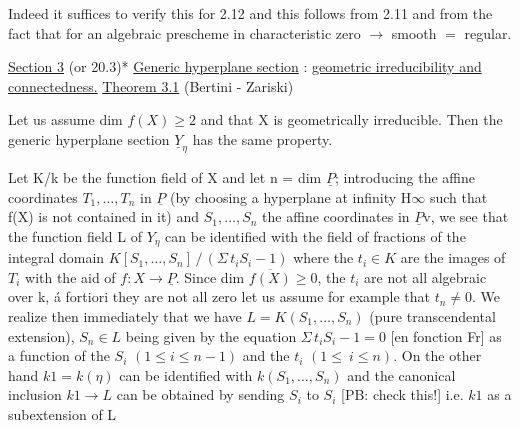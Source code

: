 
Indeed it suffices to verify this for 2.12 and this follows
from 2.11 and from the fact that for an algebraic prescheme in
characteristic zero $\rightarrow$ smooth $=$ regular.

\uline{Section 3} (or 20.3)*
\uline{Generic hyperplane section} : \uline{geometric irreducibility and}
\uline{connectedness.}
\uline{Theorem 3.1} (Bertini - Zariski)

Let us assume dim $f(X) \geq 2$ and that X is geometrically
irreducible. Then the generic hyperplane section $\underline{Y}_{\eta}$ has the same
property.

Let K/k be the function field of X and let n = dim $\underline{P}$;
introducing the affine coordinates $T_1,\dots,T_n$ in $\underline{P}$ (by choosing a
hyperplane at infinity H$\infty$ such that f(X) is not contained in it)
and $S_1,\dots,S_n$ the affine coordinates in $\underline{P}$v, we see that the
function field L of $Y_{\eta}$ can be identified with the field of
fractions of the integral domain $K[S_1,\dots,S_n] \,/\, (\Sigma\, t_iS_i - 1)$ where
the $t_i \in K$ are the images of $T_i$ with the aid of $f{:}X \rightarrow \underline{P}$. Since
dim $\overline{f(X)} \geq 0$, the $t_i$ are not all algebraic over k, á fortiori they
are not all zero let us assume for example that $t_n \neq 0$. We realize
then immediately that we have $L = K(S_1,\dots,S_n)$ (pure transcendental
extension), $S_n \in L$ being given by the equation $\Sigma\, t_iS_i - 1 = 0$
[en fonction Fr] as a function of the $S_i$ $(1 \leq i \leq n - 1)$ and the $t_i$
$(1 \leq\ i \leq n)$. On the other hand $k1 = k(\eta)$ can be identified with
$k(S_1,\dots,S_n)$ and the canonical inclusion $k1 \rightarrow L$ can be obtained by
sending $S_i$ to $S_i$ [PB: check this!] i.e. $k1$ as a subextension of L

